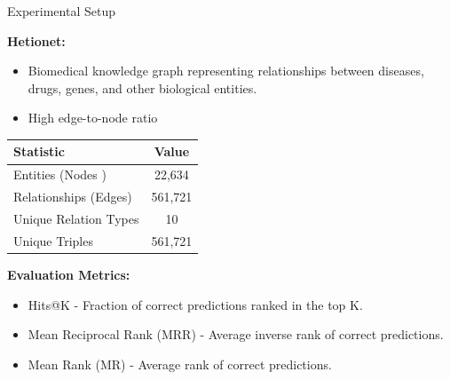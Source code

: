 \documentclass{beamer}
\begin{document}
\begin{frame}{Experimental Setup}

    \textbf{Hetionet:}

    \begin{minipage}{0.49\textwidth}
        \begin{itemize}
            \item \small Biomedical knowledge graph representing relationships between diseases, drugs, genes, and other biological entities.
            \item \small High edge-to-node ratio
        \end{itemize}
    \end{minipage}
    \hfill
    \begin{minipage}{0.50\textwidth}
        \begin{table}
            \small
            \begin{tabular}{l c}
                \toprule
                \textbf{Statistic}    & \textbf{Value} \\ \midrule
                Entities (Nodes )     & 22,634         \\
                Relationships (Edges) & 561,721        \\
                Unique Relation Types & 10             \\
                Unique Triples        & 561,721        \\ \bottomrule
            \end{tabular}
        \end{table}
        \hfill
    \end{minipage}

    \textbf{Evaluation Metrics:}

    \begin{itemize}
        \item \small Hits@K - Fraction of correct predictions ranked in the top K.
        \item \small Mean Reciprocal Rank (MRR) -  Average inverse rank of correct predictions.
        \item \small Mean Rank (MR) - Average rank of correct predictions.
    \end{itemize}

\end{frame}
\end{document}

